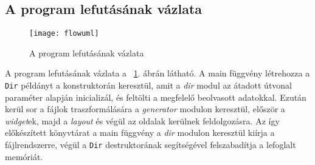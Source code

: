\documentclass[a4paper,10pt]{article}
\begin{document}
\subsection{A program lefutásának vázlata}

\begin{figure}[h]
	\begin{center}
		\texttt{[image: flowuml]}
		\caption{A program lefutásának vázlata}
		\label{fig:flow}
	\end{center}
\end{figure}

A program lefutásának vázlata a ~\ref{fig:flow}. ábrán látható. A main függvény létrehozza a \texttt{Dir} példányt a konstruktorán keresztül, amit a \emph{dir} modul az átadott útvonal paraméter alapján inicializál, és feltölti a megfelelő beolvasott adatokkal.
Ezután kerül sor a fájlok traszformálására a \emph{generator} modulon keresztül, először a \emph{widget}ek, majd a \emph{layout} és végül az oldalak kerülnek feldolgozásra.
Az így előkészített könyvtárat a main függvény a \emph{dir} modulon keresztül kiírja a fájlrendszerre, végül a \texttt{Dir} destruktorának segítségével felszabadítja a lefoglalt memóriát.
\end{document}
